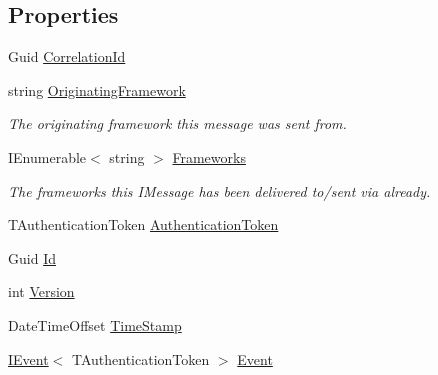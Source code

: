\subsection*{Properties}
\begin{DoxyCompactItemize}
\item 
Guid \hyperlink{classCqrs_1_1Events_1_1SagaEvent_a3bd1014469c88b763173da28a7d5023c}{Correlation\+Id}
\item 
string \hyperlink{classCqrs_1_1Events_1_1SagaEvent_a58fda921f9a06762dcb7eee86390820a}{Originating\+Framework}
\begin{DoxyCompactList}\small\item\em The originating framework this message was sent from. \end{DoxyCompactList}\item 
I\+Enumerable$<$ string $>$ \hyperlink{classCqrs_1_1Events_1_1SagaEvent_a2a52816a942f9d69a3bec20f632b853d}{Frameworks}
\begin{DoxyCompactList}\small\item\em The frameworks this I\+Message has been delivered to/sent via already. \end{DoxyCompactList}\item 
T\+Authentication\+Token \hyperlink{classCqrs_1_1Events_1_1SagaEvent_a9b5abd2cc59f97f53eaa2c2277733e7f}{Authentication\+Token}
\item 
Guid \hyperlink{classCqrs_1_1Events_1_1SagaEvent_a995f70a4311341459b96bd00488f0eea}{Id}
\item 
int \hyperlink{classCqrs_1_1Events_1_1SagaEvent_a4918d2e0a66897600143f1e645a0f136}{Version}
\item 
Date\+Time\+Offset \hyperlink{classCqrs_1_1Events_1_1SagaEvent_a6e522969d3456b62fe4291c5abc7e888}{Time\+Stamp}
\item 
\hyperlink{interfaceCqrs_1_1Events_1_1IEvent}{I\+Event}$<$ T\+Authentication\+Token $>$ \hyperlink{classCqrs_1_1Events_1_1SagaEvent_ad965f37f2c485f04978237f0d1be9cb7}{Event}
\end{DoxyCompactItemize}


